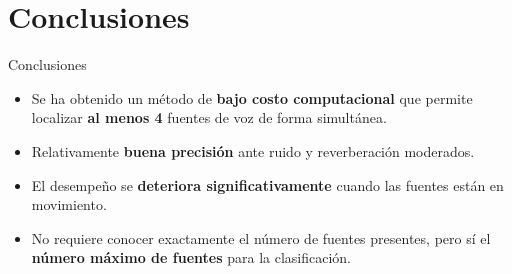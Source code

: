 \documentclass[12pt,aspectratio=169]{beamer}
\begin{document}
%	
	
	
	
	
	\section{Conclusiones}
	
	\begin{frame}{Conclusiones}
		\begin{itemize}
			\item Se ha obtenido un método de \textbf{bajo costo computacional} que permite localizar \textbf{al menos 4} fuentes de voz de forma simultánea.		
			\vspace{0.1in}
			\pause
			\item Relativamente \textbf{buena precisión} ante ruido y reverberación moderados.			
			\vspace{0.1in}
			\pause
			\item El desempeño se \textbf{deteriora significativamente} cuando las fuentes están en movimiento.			
			\vspace{0.1in}
			\pause
			\item No requiere conocer exactamente el número de fuentes presentes, pero sí el \textbf{número máximo de fuentes} para la clasificación.
		\end{itemize}
	\end{frame}


		
\begin{frame}

		\titlepage

	\end{frame}
	
\end{document}
